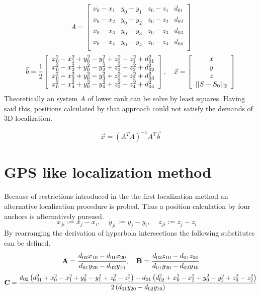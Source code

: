 \begin{equation}
	A=\left[
	\begin{array}{cccc}
		x_0-x_1 & y_0-y_1 & z_0-z_1 & d_{01}\\
		x_0-x_2 & y_0-y_2 & z_0-z_2 & d_{02}\\
		x_0-x_3 & y_0-y_3 & z_0-z_3 & d_{03}\\
		x_0-x_4 & y_0-y_4 & z_0-z_4 & d_{04}\\
	\end{array}
	\right]
\end{equation}
\begin{equation}
	\vec{b}=\cfrac{1}{2}\left[
	\begin{array}{c}
		x_0^2-x_1^2+y_0^2-y_1^2+z_0^2-z_1^2+d_{01}^2\\
		x_0^2-x_2^2+y_0^2-y_2^2+z_0^2-z_2^2+d_{02}^2\\
		x_0^2-x_3^2+y_0^2-y_3^2+z_0^2-z_3^2+d_{03}^2\\
		x_0^2-x_4^2+y_0^2-y_4^2+z_0^2-z_4^2+d_{04}^2\\
	\end{array}
	\right]
	,~~~
	\vec{x}=\left[
	\begin{array}{c}
		x\\
		y\\
		z\\
		||S-S_0||_2\\
	\end{array}
	\right]
\end{equation}
Theoretically an system $A$ of lower rank can be solve by least squares. Having said this, positions calculated by that approach could not satisfy the demands of 3D localization.

\begin{equation}
	\vec{x}=(A^T A)^{-1} A^T\vec{b}
\end{equation}

\section{GPS like localization method}

Because of restrictions introduced in the the first localization method an alternative localization procedure is probed. Thus a position calculation by four anchors is alternatively pursued.\\
\begin{equation}
	x_{ji}:=x_j-x_i,~~~~~
	y_{ji}:=y_j-y_i,~~~~~
	z_{ji}:=z_j-z_i~~~~~
\end{equation}
By rearranging the derivation of hyperbola intersections the following substitutes can be defined. 
\begin{equation}
	\mathbf{A}=\cfrac{d_{02}x_{10}-d_{01}x_{20}}{d_{01}y_{20}-d_{02}y_{10}},~~~
	\mathbf{B}=\cfrac{d_{02}z_{10}-d_{01}z_{20}}{d_{01}y_{20}-d_{02}y_{10}}
\end{equation}	
\begin{equation}
	\mathbf{C}=\cfrac{d_{02}\left(d_{01}^2+x_0^2-x_1^2+y_0^2-y_1^2+z_0^2-z_1^2\right)-d_{01}\left(d_{02}^2+x_0^2-x_2^2+y_0^2-y_2^2+z_0^2-z_2^2\right)}{2\left(d_{01}y_{20}-d_{02}y_{10}\right)}
\end{equation}	

